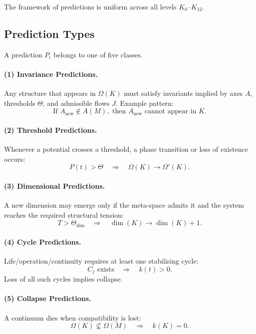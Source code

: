 The framework of predictions is uniform across all levels $K_0$–$K_{12}$.

\subsection{Prediction Types}

A prediction $P_i$ belongs to one of five classes.

\paragraph{(1) Invariance Predictions.}
Any structure that appears in $\Omega(K)$ must satisfy invariants implied by  
axes $A$, thresholds $\Theta$, and admissible flows $J$.  
Example pattern:
\[
\text{If } A_{\mathrm{new}} \notin A(M), \text{ then } A_{\mathrm{new}} \text{ cannot appear in } K.
\]

\paragraph{(2) Threshold Predictions.}
Whenever a potential crosses a threshold, a phase transition or loss of  
existence occurs:
\[
P(t) > \Theta \quad\Rightarrow\quad \Omega(K)\to\Omega'(K).
\]

\paragraph{(3) Dimensional Predictions.}
A new dimension may emerge only if the meta-space admits it and the system  
reaches the required structural tension:
\[
T > \Theta_{\mathrm{dim}}
\quad\Rightarrow\quad
\dim(K)\to\dim(K)+1.
\]

\paragraph{(4) Cycle Predictions.}
Life/operation/continuity requires at least one stabilising cycle:
\[
C_j \text{ exists} \quad\Rightarrow\quad k(t)>0.
\]
Loss of all such cycles implies collapse.

\paragraph{(5) Collapse Predictions.}
A continuum dies when compatibility is lost:
\[
\Omega(K)\not\subseteq\Omega(M)
\quad\Rightarrow\quad
k(K)=0.
\]

